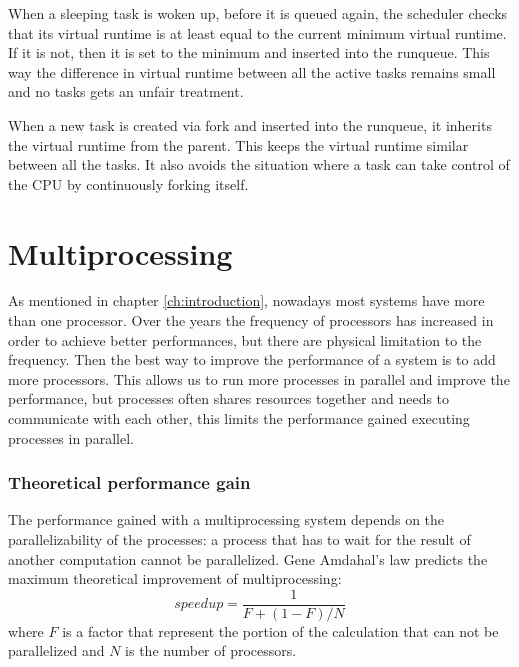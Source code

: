 When a sleeping task is woken up, before it is queued again, the scheduler checks that its virtual runtime is at least equal to the current minimum virtual runtime. If it is not, then it is set to the minimum and inserted into the runqueue. This way the difference in virtual runtime between all the active tasks remains small and no tasks gets an unfair treatment. 

When a new task is created via fork and inserted into the runqueue, it inherits the virtual runtime from the parent. This keeps the virtual runtime similar between all the tasks. It also avoids the situation where a task can take control of the CPU by continuously forking itself.

\section{Multiprocessing}

As mentioned in chapter \ref{ch:introduction}, nowadays most systems have more than one processor. Over the years the frequency of processors has increased in order to achieve better performances, but there are physical limitation to the frequency. Then the best way to improve the performance of a system is to add more processors. This allows us to run more processes in parallel and improve the performance, but processes often shares resources together and needs to communicate with each other, this limits the performance gained executing processes in parallel.

\subsubsection{Theoretical performance gain}
The performance gained with a multiprocessing system depends on the parallelizability of the processes: a process that has to wait for the result of another computation cannot be parallelized. Gene Amdahal's law\cite{amdahl} predicts the maximum theoretical improvement of multiprocessing:
\begin{equation}
    speedup = \frac{1}{F + (1-F)/N}
\end{equation}
where $F$ is a factor that represent the portion of the calculation that can not be parallelized and $N$ is the number of processors.

\label{fig:plot_cpu}

